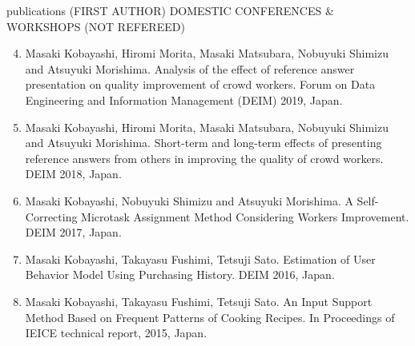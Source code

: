\documentclass{resume} %
\begin{document}
\begin{rSection}{publications (FIRST AUTHOR)}
DOMESTIC CONFERENCES \& WORKSHOPS (NOT REFEREED)
\begin{enumerate}
  \setcounter{enumi}{3}
  \item Masaki Kobayashi, Hiromi Morita, Masaki Matsubara, Nobuyuki Shimizu and Atsuyuki Morishima. Analysis of the effect of reference answer presentation on quality improvement of crowd workers. Forum on Data Engineering
  and Information Management (DEIM) 2019, Japan.
  \item Masaki Kobayashi, Hiromi Morita, Masaki Matsubara, Nobuyuki Shimizu and Atsuyuki Morishima. Short-term and long-term effects of presenting reference answers from others in improving the quality of crowd workers. DEIM 2018, Japan.
  \item Masaki Kobayashi, Nobuyuki Shimizu and Atsuyuki Morishima. A Self-Correcting Microtask Assignment Method Considering Workers Improvement. DEIM 2017, Japan.
  \item Masaki Kobayashi, Takayasu Fushimi, Tetsuji Sato. Estimation of User Behavior Model Using Purchasing History. DEIM 2016, Japan.
  \item Masaki Kobayashi, Takayasu Fushimi, Tetsuji Sato. An Input Support Method Based on Frequent Patterns of Cooking Recipes. In Proceedings of IEICE technical report, 2015, Japan.
\end{enumerate}
\end{rSection}
\end{document}
